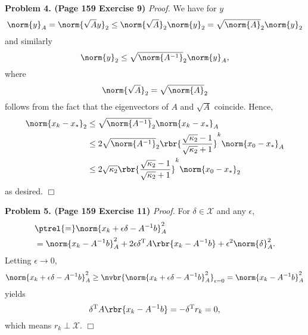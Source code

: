 \documentclass[english, nochinese]{pnote}
\begin{document}
\textbf{Problem 4. (Page 159 Exercise 9)} \textit{Proof.} We have for $y$
\begin{equation}
\norm{y}_A = \norm{ \sqrt{A} y }_2 \le \norm{\sqrt{A}}_2 \norm{y}_2 = \sqrt{\norm{A}}_2 \norm{y}_2
\end{equation}
and similarly
\begin{equation}
\norm{y}_2 \le \sqrt{\norm{A^{-1}}}_2 \norm{y}_A,
\end{equation}
where
\begin{equation}
\norm{\sqrt{A}}_2 = \sqrt{\norm{A}}_2
\end{equation}
follows from the fact that the eigenvectors of $A$ and $\sqrt{A}$ coincide. Hence,
\begin{equation}
\begin{split}
\norm{ x_k - x_{\ast} }_2 &\le \sqrt{\norm{A^{-1}}}_2 \norm{ x_k - x_{\ast} }_A \\
&\le 2 \sqrt{\norm{A^{-1}}}_2 \rbr{\frac{ \sqrt{\kappa_2} - 1 }{ \sqrt{\kappa_2} + 1 }}^k \norm{ x_0 - x_{\ast} }_A \\
&\le 2 \sqrt{\kappa_2} \rbr{\frac{ \sqrt{\kappa_2} - 1 }{ \sqrt{\kappa_2} + 1 }}^k \norm{ x_0 - x_{\ast} }_2
\end{split}
\end{equation}
as desired.
\hfill$\Box$

\textbf{Problem 5. (Page 159 Exercise 11)} \textit{Proof.} For $ \delta \in \mathcal{X} $ and any $\epsilon$,
\begin{equation}
\begin{split}
&\ptrel{=} \norm{ x_k + \epsilon \delta - A^{-1} b }_A^2 \\
&= \norm{ x_k - A^{-1} b }_A^2 + 2 \epsilon \delta^{\text{T}} A \rbr{ x_k - A^{-1} b } + \epsilon^2 \norm{\delta}_A^2.
\end{split}
\end{equation}
Letting $ \epsilon \rightarrow 0 $,
\begin{equation}
\norm{ x_k + \epsilon \delta - A^{-1} b }_A^2 \ge \nvbr{\norm{ x_k + \epsilon \delta - A^{-1} b }_A^2}_{ \epsilon = 0 } = \norm{ x_k - A^{-1} b }_A^2
\end{equation}
yields
\begin{equation}
\delta^{\text{T}} A \rbr{ x_k - A^{-1} b } = -\delta^{\text{T}} r_k = 0,
\end{equation}
which means $ r_k \perp \mathcal{X} $.
\hfill$\Box$
\end{document}

